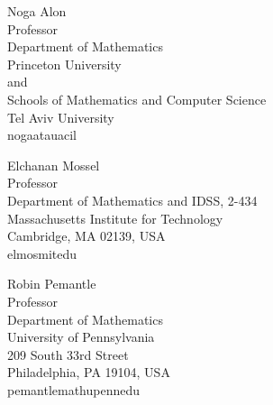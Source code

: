 \documentclass{toc}
\begin{document}
\begin{tocauthors}
\begin{tocinfo}[alon]
 Noga Alon\\
 Professor\\
 Department of Mathematics\\
 Princeton University\\
 and\\
 Schools of Mathematics and Computer Science\\
 Tel Aviv University\\
 nogaa\tocat{}tau\tocdot{}ac\tocdot{}il
\end{tocinfo}
\begin{tocinfo}[mossel]
  Elchanan Mossel\\
  Professor\\
  Department of Mathematics and IDSS, 2-434\\
  Massachusetts Institute for Technology\\ 
%
  Cambridge, MA 02139, USA\\
  elmos\tocat{}mit\tocdot{}edu 
\end{tocinfo}
\begin{tocinfo}[pemantle]
  Robin Pemantle\\
  Professor\\
  Department of Mathematics\\
  University of Pennsylvania\\
  209 South 33rd Street\\
  Philadelphia, PA 19104, USA\\
  pemantle\tocat{}math\tocdot{}upenn\tocdot{}edu 
\end{tocinfo}
\end{tocauthors}
\end{document}
